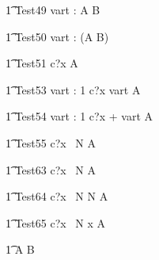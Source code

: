 
\begin{circusaction}
  \t1 Test49 \circdef \circwait vart : \nat  \circspot  A \circseq   B \\
\end{circusaction}

\begin{circusaction}
  \t1 Test50 \circdef \circwait vart : \nat  \circspot  (A \circseq  B) \\
\end{circusaction}


\begin{circusaction}
   \t1 Test51 \circdef c?x \then  {} \rcirctime A \\
\end{circusaction}

\begin{circusaction}
   \t1 Test53 \circdef \circvres vart : 1   \circspot c?x \then  \lcirctime vart \rcirctime A \\
\end{circusaction}

\begin{circusaction}
   \t1 Test54 \circdef \circvres vart : 1   \circspot c?x \then  {} + vart \rcirctime A \\
\end{circusaction}



\begin{circusaction}
   \t1 Test55 \circdef c?x \circat~N  \then A \\
\end{circusaction}


 
\begin{circusaction}
    \t1 Test63 \circdef c?x \circat~N  \then {} \rcirctime A \\
\end{circusaction}
 
\begin{circusaction}
    \t1 Test64 \circdef c?x \circat~N  \then \lcirctime N \rcirctime A \\
\end{circusaction}

\begin{circusaction}
    \t1 Test65 \circdef c?x \circat~N  \then \lcirctime x \rcirctime A \\
\end{circusaction}


\begin{circusaction}        
        \t1 \circspot A \circseq B\\
\end{circusaction}


\begin{circus}    
\circend
\end{circus}
